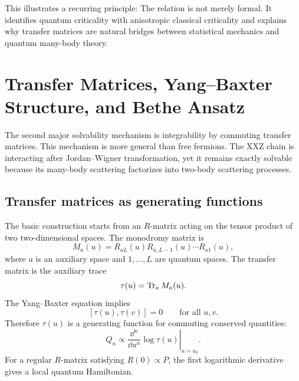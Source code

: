 This illustrates a recurring principle:
The relation is not merely formal.  It identifies quantum criticality with anisotropic classical criticality and explains why transfer matrices are natural bridges between statistical mechanics and quantum many-body theory.

\section{Transfer Matrices, Yang--Baxter Structure, and Bethe Ansatz}
\label{sec:transfer-yang-baxter-bethe-synthesis}

The second major solvability mechanism is integrability by commuting transfer matrices.  This mechanism is more general than free fermions.  The XXZ chain is interacting after Jordan--Wigner transformation, yet it remains exactly solvable because its many-body scattering factorizes into two-body scattering processes.

\subsection{Transfer matrices as generating functions}

The basic construction starts from an \(R\)-matrix acting on the tensor product of two two-dimensional spaces.  The monodromy matrix is
\begin{equation}
\label{eq:conclusion-monodromy}
    M_a(u)
    =
    R_{aL}(u)R_{a,L-1}(u)\cdots R_{a1}(u),
\end{equation}
where \(a\) is an auxiliary space and \(1,\ldots,L\) are quantum spaces.  The transfer matrix is the auxiliary trace
\begin{equation}
\label{eq:conclusion-transfer-matrix}
    \tau(u)=\operatorname{Tr}_a M_a(u).
\end{equation}
The Yang--Baxter equation implies
\begin{equation}
\label{eq:conclusion-commuting-transfer}
    [\tau(u),\tau(v)]=0
    \qquad
    \text{for all }u,v.
\end{equation}
Therefore \(\tau(u)\) is a generating function for commuting conserved quantities:
\begin{equation}
\label{eq:conclusion-log-transfer-charges}
    Q_n
    \propto
    \left.
    \frac{\dd^n}{\dd u^n}\log\tau(u)
    \right|_{u=u_0} .
\end{equation}
For a regular \(R\)-matrix satisfying \(R(0)\propto P\), the first logarithmic derivative gives a local quantum Hamiltonian.

